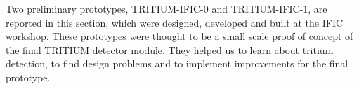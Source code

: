 Two preliminary prototypes, TRITIUM-IFIC-0 and TRITIUM-IFIC-1, are reported in this section, which were designed, developed and built at the IFIC workshop. These prototypes were thought to be a small scale proof of concept  of the final TRITIUM detector module. They helped us to learn about tritium detection, to find design problems and to implement improvements for the final prototype.